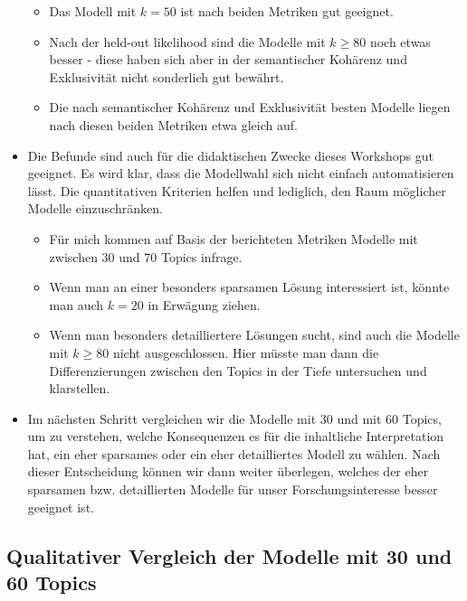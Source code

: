 \documentclass[
]{book}
\providecommand{\tightlist}{%
  \setlength{\itemsep}{0pt}\setlength{\parskip}{0pt}}
\begin{document}
\begin{itemize}
  \begin{itemize}
  \tightlist
  \item
    Das Modell mit \(k = 50\) ist nach beiden Metriken gut geeignet.
  \item
    Nach der held-out likelihood sind die Modelle mit \(k \ge 80\) noch etwas besser - diese haben sich aber in der semantischer Kohärenz und Exklusivität nicht sonderlich gut bewährt.
  \item
    Die nach semantischer Kohärenz und Exklusivität besten Modelle liegen nach diesen beiden Metriken etwa gleich auf.
  \end{itemize}
\item
  Die Befunde sind auch für die didaktischen Zwecke dieses Workshops gut geeignet. Es wird klar, dass die Modellwahl sich nicht einfach automatisieren lässt. Die quantitativen Kriterien helfen und lediglich, den Raum möglicher Modelle einzuschränken.

  \begin{itemize}
  \tightlist
  \item
    Für mich kommen auf Basis der berichteten Metriken Modelle mit zwischen 30 und 70 Topics infrage.
  \item
    Wenn man an einer besonders sparsamen Lösung interessiert ist, könnte man auch \(k = 20\) in Erwägung ziehen.
  \item
    Wenn man besonders detailliertere Lösungen sucht, sind auch die Modelle mit \(k \ge 80\) nicht ausgeschlossen. Hier müsste man dann die Differenzierungen zwischen den Topics in der Tiefe untersuchen und klarstellen.
  \end{itemize}
\item
  Im nächsten Schritt vergleichen wir die Modelle mit 30 und mit 60 Topics, um zu verstehen, welche Konsequenzen es für die inhaltliche Interpretation hat, ein eher sparsames oder ein eher detailliertes Modell zu wählen. Nach dieser Entscheidung können wir dann weiter überlegen, welches der eher sparsamen bzw. detaillierten Modelle für unser Forschungsinteresse besser geeignet ist.
\end{itemize}

\hypertarget{qualitativer-vergleich-der-modelle-mit-30-und-60-topics}{%
\subsection{Qualitativer Vergleich der Modelle mit 30 und 60 Topics}\label{qualitativer-vergleich-der-modelle-mit-30-und-60-topics}}
\end{document}
